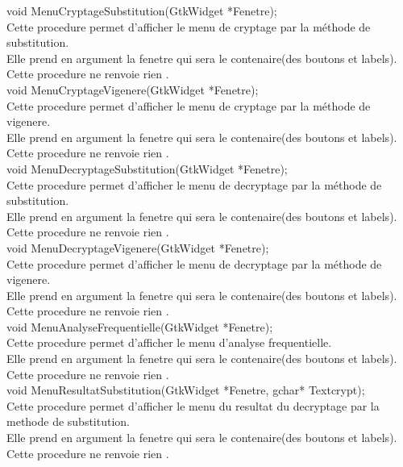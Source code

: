 \documentclass[a4]{article}
\begin{document}
	void MenuCryptageSubstitution(GtkWidget *Fenetre);\\
		Cette procedure permet d'afficher le menu de cryptage par la méthode de substitution.\\
		Elle prend en argument la fenetre qui sera le contenaire(des boutons et labels).\\
		Cette procedure ne renvoie rien .\\
	
	void MenuCryptageVigenere(GtkWidget *Fenetre);\\
		Cette procedure permet d'afficher le menu de cryptage par la méthode de vigenere.\\
		Elle prend en argument la fenetre qui sera le contenaire(des boutons et labels).\\
		Cette procedure ne renvoie rien .\\
	
	void MenuDecryptageSubstitution(GtkWidget *Fenetre);\\
		Cette procedure permet d'afficher le menu de decryptage par la méthode de substitution.\\
		Elle prend en argument la fenetre qui sera le contenaire(des boutons et labels).\\
		Cette procedure ne renvoie rien .\\
	
	void MenuDecryptageVigenere(GtkWidget *Fenetre);\\
		Cette procedure permet d'afficher le menu de decryptage par la méthode de vigenere.\\
		Elle prend en argument la fenetre qui sera le contenaire(des boutons et labels).\\
		Cette procedure ne renvoie rien .\\
	
	void MenuAnalyseFrequentielle(GtkWidget *Fenetre);\\
		Cette procedure permet d'afficher le menu d'analyse frequentielle.\\
		Elle prend en argument la fenetre qui sera le contenaire(des boutons et labels).\\
		Cette procedure ne renvoie rien .\\
	
	void MenuResultatSubstitution(GtkWidget *Fenetre, gchar* Textcrypt);\\
		Cette procedure permet d'afficher le menu du resultat du decryptage par la methode de substitution.\\
		Elle prend en argument la fenetre qui sera le contenaire(des boutons et labels).\\
		Cette procedure ne renvoie rien .\\
	
\end{document}
